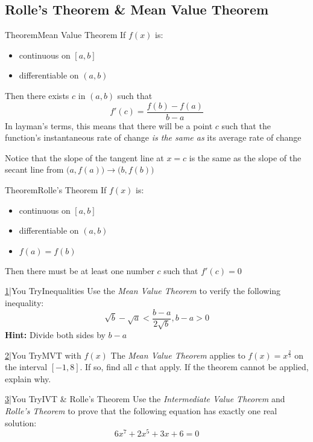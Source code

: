 \documentclass{MathNotes}
\newenvironment{theorem}[1]{\begin{GrayBox}{Theorem}{#1}}{\end{GrayBox}}
\newenvironment{practice}[2]{\begin{PurpleBox}{\texorpdfstring{#1}\Big|You Try}{#2}}{\end{PurpleBox}}
\begin{document}
\subsection{Rolle's Theorem \& Mean Value Theorem}
\begin{multicols}{2}
	\begin{theorem}{Mean Value Theorem}
		If $f(x)$ is:
		\begin{itemize}
			\item continuous on $[a, b]$
			\item differentiable on $(a, b)$
		\end{itemize}
		Then there exists $c$ in $(a, b)$ such that
		$$f'(c)=\frac{f(b)-f(a)}{b - a}$$ In layman's terms, this
		means that there will be a point $c$ such that the function's instantaneous
		rate of change \textit{ is the same as} its average rate of change
	\end{theorem}

	\begin{center}
		
	\end{center}

	Notice that the slope of the tangent line at $x=c$ is the same as the slope
	of the secant line from $\big(a, f(a)\big)\to\big(b,f(b)\big)$
\end{multicols}
\begin{multicols}{2}
	\begin{center}
		
	\end{center}
	\begin{theorem}{Rolle's Theorem}
		If $f(x)$ is:
		\begin{itemize}
			\item continuous on $[a, b]$
			\item differentiable on $(a, b)$
			\item $f(a)=f(b)$
		\end{itemize}
		Then there must be at least one number $c$ such that $f'(c)=0$
	\end{theorem}
\end{multicols}
\begin{multicols}{2}
	\begin{practice}{\hyperref[ans:3.2-1]{1}}{Inequalities}\label{prac:3.2-1}
		Use the \textit{Mean Value Theorem} to verify the following inequality:
		$$\sqrt{b}-\sqrt{a}<\frac{b-a}{2\sqrt{b}},b-a>0$$
		\textbf{Hint:} Divide both sides by $b-a$
	\end{practice}
	\begin{practice}{\hyperref[ans:3.2-2]{2}}{MVT with $f(x)$}\label{prac:3.2-2}
		The \textit{Mean Value Theorem} applies to $f(x)=x^{\frac{2}{3}}$ on the
		interval $[-1, 8]$. If so, find all $c$ that apply. If the theorem cannot
		be applied, explain why.
	\end{practice}
\end{multicols}
\begin{practice}{\hyperref[ans:3.2-3]{3}}{IVT \& Rolle's Theorem}\label{prac:3.2-3}
	Use the \textit{Intermediate Value Theorem} and \textit{Rolle's Theorem} to
	prove that the following equation has exactly one real solution:
	$$6x^7+2x^5+3x+6=0$$
\end{practice}
\end{document}
